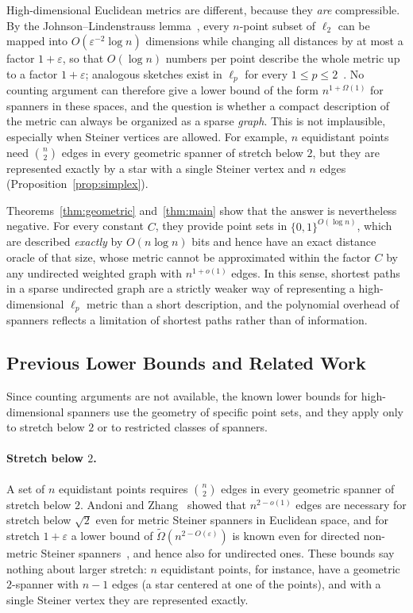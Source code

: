 \documentclass[11pt]{article}
\theoremstyle{definition}
\theoremstyle{remark}
\begin{document}
High-dimensional Euclidean metrics are different, because they \emph{are} compressible. By the Johnson--Lindenstrauss lemma~\cite{johnson1984extensions}, every $n$-point subset of $\ell_2$ can be mapped into $O(\varepsilon^{-2} \log n)$ dimensions while changing all distances by at most a factor $1 + \varepsilon$, so that $O(\log n)$ numbers per point describe the whole metric up to a factor $1 + \varepsilon$; analogous sketches exist in $\ell_p$ for every $1 \le p \le 2$~\cite{indyk2006stable}. No counting argument can therefore give a lower bound of the form $n^{1 + \Omega(1)}$ for spanners in these spaces, and the question is whether a compact description of the metric can always be organized as a sparse \emph{graph}. This is not implausible, especially when Steiner vertices are allowed. For example, $n$ equidistant points need $\binom{n}{2}$ edges in every geometric spanner of stretch below $2$, but they are represented exactly by a star with a single Steiner vertex and $n$ edges (Proposition~\ref{prop:simplex}).

Theorems~\ref{thm:geometric} and~\ref{thm:main} show that the answer is nevertheless negative. For every constant $C$, they provide point sets in $\{0, 1\}^{O(\log n)}$, which are described \emph{exactly} by $O(n \log n)$ bits and hence have an exact distance oracle of that size, whose metric cannot be approximated within the factor $C$ by any undirected weighted graph with $n^{1 + o(1)}$ edges. In this sense, shortest paths in a sparse undirected graph are a strictly weaker way of representing a high-dimensional $\ell_p$ metric than a short description, and the polynomial overhead of spanners reflects a limitation of shortest paths rather than of information.

\subsection{Previous Lower Bounds and Related Work}
\label{subsec:related}

Since counting arguments are not available, the known lower bounds for high-dimensional spanners use the geometry of specific point sets, and they apply only to stretch below $2$ or to restricted classes of spanners.

\paragraph{Stretch below $2$.}
A set of $n$ equidistant points requires $\binom{n}{2}$ edges in every geometric spanner of stretch below $2$. Andoni and Zhang~\cite{andoni2023subquadratic} showed that $n^{2 - o(1)}$ edges are necessary for stretch below $\sqrt{2}$ even for metric Steiner spanners in Euclidean space, and for stretch $1 + \varepsilon$ a lower bound of $\tilde{\Omega}(n^{2 - O(\varepsilon)})$ is known even for directed non-metric Steiner spanners~\cite{jayaram2026near}, and hence also for undirected ones. These bounds say nothing about larger stretch: $n$ equidistant points, for instance, have a geometric $2$-spanner with $n - 1$ edges (a star centered at one of the points), and with a single Steiner vertex they are represented exactly.
\end{document}
